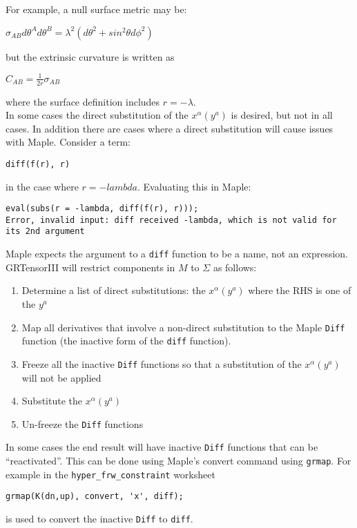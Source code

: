 \documentclass{article}
\begin{document}
For example, a null surface metric may be:
\begin{center}
$\sigma_{AB} d\theta^A d\theta^B = \lambda^2 \left(d\theta^2 + sin^2 \theta d\phi^2 \right)$
\end{center}
but the extrinsic curvature is written as 
\begin{center}
$C_{AB} = \frac{1}{2r} \sigma_{AB}$
\end{center}
where the surface definition includes $r=-\lambda$. \\

In some cases the direct substitution of the $x^\alpha(y^a)$ is desired, but not in all cases. In addition there are cases where
a direct substitution will cause issues with Maple. Consider a term:
\begin{center}
\texttt{diff(f(r), r)}
\end{center}
in the case where $r=-lambda$. Evaluating this in Maple:
\begin{center}
\begin{verbatim}
eval(subs(r = -lambda, diff(f(r), r)));
Error, invalid input: diff received -lambda, which is not valid for its 2nd argument
\end{verbatim}
\end{center}
Maple expects the argument to a \texttt{diff} function to be a name, not an expression. \\

GRTensorIII will restrict components in $M$ to $\Sigma$ as follows:
\begin{enumerate}
\item Determine a list of direct substitutions: the $x^\alpha(y^a)$ where the RHS is one of the $y^a$
\item Map all derivatives that involve a non-direct substitution to the Maple \texttt{Diff} function (the
inactive form of the \texttt{diff} function). 
\item Freeze all the inactive \texttt{Diff} functions so that a substitution of the $x^\alpha(y^a)$ will not 
be applied
\item Substitute the $x^\alpha(y^a)$
\item Un-freeze the \texttt{Diff} functions
\end{enumerate}

In some cases the end result will have inactive \texttt{Diff} functions that can be ``reactivated''. This can be done using Maple's
convert command using \texttt{grmap}. For example in the \texttt{hyper\_frw\_constraint} worksheet
\begin{verbatim}
grmap(K(dn,up), convert, 'x', diff);
\end{verbatim}
is used to convert the inactive \texttt{Diff} to \texttt{diff}. \\
\end{document}
